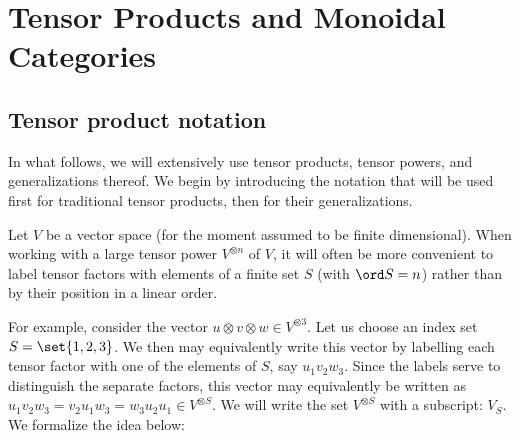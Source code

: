 \chapter{Tensor Products and Monoidal Categories}
\label{ch:intro}

\section{Tensor product notation}
In what follows, we will extensively use tensor products, tensor powers, and
generalizations thereof. We begin by introducing the notation that will be used
first for traditional tensor products, then for their generalizations.

Let $V$ be a vector space (for the moment assumed to be finite dimensional).
When working with a large tensor power $V^{\otimes n}$ of $V$, it will often be
more convenient to label tensor factors with elements of a finite set $S$ (with
$\ord S = n$) rather than by their position in a linear order.

For example, consider the vector $u \otimes v \otimes w \in V^{\otimes 3}$. Let
us choose an index set $S = \set{1,2,3}$. We then may equivalently write this
vector by labelling each tensor factor with one of the elements of $S$, say
$u_1v_2w_3$. Since the labels serve to distinguish the separate factors, this
vector may equivalently be written as $u_1v_2w_3 = v_2u_1w_3 = w_3u_2u_1 \in
V^{\otimes S}$. We will write the set $V^{\otimes S}$ with a subscript: $V_S$.
We formalize the idea below:

